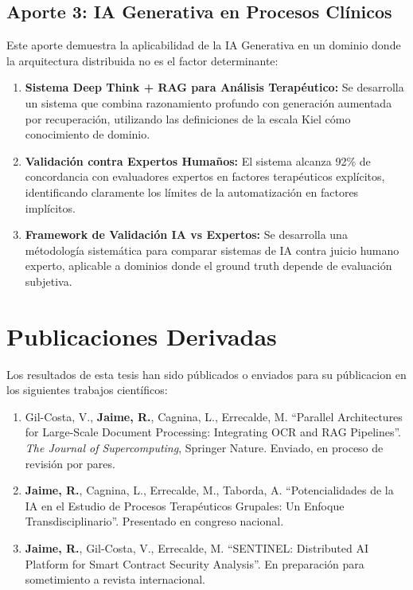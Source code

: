 \documentclass[12pt,a4paper,twoside]{book}
\begin{document}
\subsection{Aporte 3: IA Generativa en Procesos Clínicos}

Este aporte demuestra la aplicabilidad de la IA Generativa en un dominio donde la arquitectura distribuida no es el factor determinante:

\begin{enumerate}[label=\textbf{3.\arabic*.}]
    \item \textbf{Sistema Deep Think + RAG para Análisis Terapéutico:} Se desarrolla un sistema que combina razonamiento profundo con generación aumentada por recuperación, utilizando las definiciones de la escala Kiel cómo conocimiento de dominio.
    
    \item \textbf{Validación contra Expertos Humaños:} El sistema alcanza 92\% de concordancia con evaluadores expertos en factores terapéuticos explícitos, identificando claramente los límites de la automatización en factores implícitos.
    
    \item \textbf{Framework de Validación IA vs Expertos:} Se desarrolla una métodología sistemática para comparar sistemas de IA contra juicio humano experto, aplicable a dominios donde el ground truth depende de evaluación subjetiva.
\end{enumerate}

\section{Publicaciones Derivadas}

Los resultados de esta tesis han sido públicados o enviados para su públicacion en los siguientes trabajos científicos:

\begin{enumerate}
    \item Gil-Costa, V., \textbf{Jaime, R.}, Cagnina, L., Errecalde, M. ``Parallel Architectures for Large-Scale Document Processing: Integrating OCR and RAG Pipelines''. \textit{The Journal of Supercomputing}, Springer Nature. Enviado, en proceso de revisión por pares.
    
    \item \textbf{Jaime, R.}, Cagnina, L., Errecalde, M., Taborda, A. ``Potencialidades de la IA en el Estudio de Procesos Terapéuticos Grupales: Un Enfoque Transdisciplinario''. Presentado en congreso nacional.
    
    \item \textbf{Jaime, R.}, Gil-Costa, V., Errecalde, M. ``SENTINEL: Distributed AI Platform for Smart Contract Security Analysis''. En preparación para sometimiento a revista internacional.
\end{enumerate}
\end{document}
